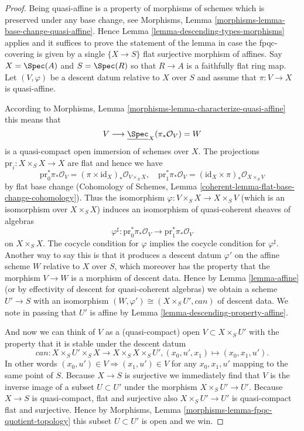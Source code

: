 \begin{proof}
Being quasi-affine is a property of morphisms of schemes
which is preserved under any base change, see
Morphisms, Lemma \ref{morphisms-lemma-base-change-quasi-affine}.
Hence Lemma \ref{lemma-descending-types-morphisms} applies
and it suffices to prove the statement of the lemma
in case the fpqc-covering is given by a single
$\{X \to S\}$ flat surjective morphism of affines.
Say $X = \Spec(A)$ and $S = \Spec(R)$ so
that $R \to A$ is a faithfully flat ring map.
Let $(V, \varphi)$ be a descent datum relative to $X$ over $S$
and assume that $\pi : V \to X$ is quasi-affine.

\medskip\noindent
According to Morphisms, Lemma \ref{morphisms-lemma-characterize-quasi-affine}
this means that
$$
V \longrightarrow \underline{\Spec}_X(\pi_*\mathcal{O}_V) = W
$$
is a quasi-compact open immersion of schemes over $X$.
The projections $\text{pr}_i : X \times_S X \to X$ are flat
and hence we have
$$
\text{pr}_0^*\pi_*\mathcal{O}_V =
(\pi \times \text{id}_X)_*\mathcal{O}_{V \times_S X}, \quad
\text{pr}_1^*\pi_*\mathcal{O}_V =
(\text{id}_X \times \pi)_*\mathcal{O}_{X \times_S V}
$$
by flat base change
(Cohomology of Schemes, Lemma \ref{coherent-lemma-flat-base-change-cohomology}).
Thus the isomorphism $\varphi : V \times_S X \to X \times_S V$ (which
is an isomorphism over $X \times_S X$) induces an isomorphism
of quasi-coherent sheaves of algebras
$$
\varphi^\sharp :
\text{pr}_0^*\pi_*\mathcal{O}_V
\longrightarrow
\text{pr}_1^*\pi_*\mathcal{O}_V
$$
on $X \times_S X$.
The cocycle condition for $\varphi$ implies the cocycle condition
for $\varphi^\sharp$. Another way to say this is that it produces
a descent datum $\varphi'$ on the affine scheme $W$ relative to
$X$ over $S$, which moreover has the property that the morphism
$V \to W$ is a morphism of descent data.
Hence by Lemma \ref{lemma-affine}
(or by effectivity of descent for quasi-coherent
algebras) we obtain a scheme $U' \to S$ with an isomorphism
$(W, \varphi') \cong (X \times_S U', can)$ of descent data.
We note in passing that $U'$ is affine by
Lemma \ref{lemma-descending-property-affine}.

\medskip\noindent
And now we can think of $V$ as a (quasi-compact)
open $V \subset X \times_S U'$ with the property that
it is stable under the descent datum
$$
can : X \times_S U' \times_S X \to X \times_S X \times_S U',
(x_0, u', x_1) \mapsto (x_0, x_1, u').
$$
In other words $(x_0, u') \in V \Rightarrow (x_1, u') \in V$
for any $x_0, x_1, u'$ mapping to the same point of $S$.
Because $X \to S$ is surjective we immediately find that
$V$ is the inverse image of a subset $U \subset U'$ under
the morphism $X \times_S U' \to U'$.
Because $X \to S$ is quasi-compact, flat and surjective
also $X \times_S U' \to U'$ is quasi-compact flat and surjective.
Hence by Morphisms, Lemma \ref{morphisms-lemma-fpqc-quotient-topology}
this subset $U \subset U'$ is open and we win.
\end{proof}












